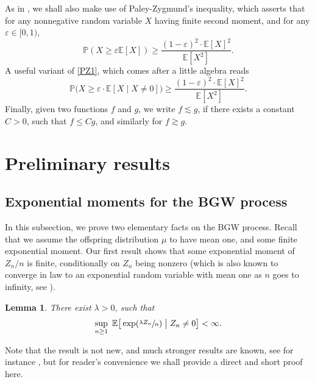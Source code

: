 \documentclass[JEP,XML,SOM,Unicode,NoFloatCountersInSection,published]{cedram}
\theoremstyle{plain}
\newtheorem{lemma}[theorem]{Lemma}
\theoremstyle{definition}
\newcommand{\1}{{\text{\Large $\mathfrak 1$}}}
\begin{document}
As in \cite{AHJ}, we shall also make use of Paley-Zygmund's inequality, which asserts that for any nonnegative random variable $X$ having finite second moment,
and for any $\varepsilon \in [0,1)$,
\begin{equation}\label{PZ1}
\mathbb P(X\ge \varepsilon \mathbb E[X]) \ge \frac {(1-\varepsilon)^2\cdot \mathbb E[X]^2}{\mathbb E[X^2]}.
\end{equation}
A useful variant of \eqref{PZ1}, which comes after a little
algebra reads
\begin{equation}\label{PZ}
\mathbb P\big(X\ge \varepsilon\cdot \mathbb E[X\mid X\neq 0]\big) \ge \frac {(1-\varepsilon)^2\cdot \mathbb E[X]^2}{\mathbb E[X^2]}.
\end{equation}
Finally, given two functions $f$ and $g$, we write $f\lesssim g$, if there exists a constant $C>0$, such that $f\le Cg$, and similarly for $f\gtrsim g$.

\section{Preliminary results}\label{sec-prelim}
\subsection{Exponential moments for the BGW process}
In this subsection, we prove two elementary facts on the BGW process. Recall that we assume the offspring distribution $\mu$ to have mean one, and some finite exponential moment. Our first result shows that some exponential moment of $Z_n/n$ is finite, conditionally on $Z_n$ being nonzero
(which is also known to converge in law to an exponential random variable with mean one as $n$ goes to infinity, see \cite[Th.\,2 p.\,20]{AN}).
\begin{lemma}\label{lem.BGW}
There exist $\lambda>0$, such that
\begin{equation*}%
\sup_{n\ge 1} \ \mathbb E\big[\exp(\sfrac{\lambda Z_n}{n})\bigm| Z_n\neq 0\big] < \infty.
\end{equation*}
\end{lemma}
Note that the result is not new, and much stronger results are known, see for instance \cite{NV75,NV03}, but for reader's convenience
we shall provide a direct and short proof here.
\end{document}
